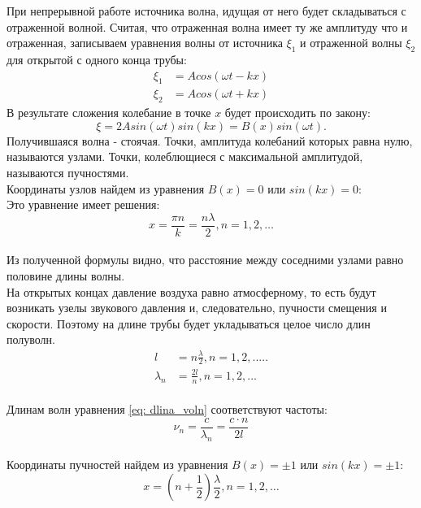 При непрерывной работе источника волна, идущая от него будет складываться с отраженной волной. Считая, что отраженная волна имеет ту же амплитуду что и отраженная, записываем уравнения волны от источника $\xi_{1}$ и отраженной волны $\xi_{2}$ для открытой с одного конца трубы:
\begin{align}
    \xi_{1} &= A cos(\omega t - kx)\\
    \xi_{2} &= A cos(\omega t + kx)
\end{align}
В результате сложения колебание в точке $x$ будет происходить по закону:
\begin{equation}
    \xi = 2Asin(\omega t)sin(kx) = B(x)sin(\omega t).
\end{equation}
Получившаяся волна - стоячая. Точки, амплитуда колебаний которых равна нулю, называются узлами. Точки, колеблющиеся с максимальной амплитудой, называются пучностями.\\
Координаты узлов найдем из уравнения $B(x) = 0$ или $sin(kx) = 0$:\\
Это уравнение имеет решения:
\begin{equation}
    x = \frac{\pi n}{k} = \frac{n\lambda}{2}, n = 1,2,\ldots
\end{equation}\\
Из полученной формулы видно, что расстояние между соседними узлами равно половине длины волны.\\
На открытых концах давление воздуха равно атмосферному, то есть будут возникать узелы звукового давления и, следовательно, пучности смещения и скорости. Поэтому на длине трубы будет укладываться целое число длин полуволн.
\begin{align} \label{eq: dlina_voln}
    l &= n\frac{\lambda}{2}, n = 1,2,..\ldots\\
    \lambda_{n} &= \frac{2l}{n}, n = 1,2,\ldots
\end{align}\\
Длинам волн уравнения \ref{eq: dlina_voln} соответствуют частоты:
\begin{equation}
    \nu_{n} = \frac{c}{\lambda_{n}} = \frac{c\cdot n}{2l}
\end{equation}\\
Координаты пучностей найдем из уравнения $B(x) = \pm 1$ или $sin(kx) = \pm 1$:\\ 
\begin{equation}
    x = \left( n + \frac{1}{2} \right)\frac{\lambda}{2}, n = 1,2,\ldots
\end{equation}\\

